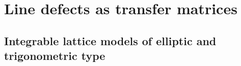 \newcommand{\Spinor}{S}
\newcommand{\PB}{P}
\newcommand{\KB}{\overline{K}}
\newcommand{\SG}{\mathscr{G}}
\newcommand{\SR}{\mathscr{R}}
\renewcommand{\SV}{\mathscr{V}}
\newcommand{\SP}{\mathscr{P}}
\newcommand{\ST}{\mathscr{T}}
\newcommand{\STb}{\overline{\mathscr{T}}}
\newcommand{\Mod}{\mathscr{M}}
\newcommand{\Lag}{\mathscr{L}}


\newcommand{\Qone}{\mathbf{Q}}
\newcommand{\QQ}{\slashed{Q}}
\newcommand{\QQt}{\widetilde{\QQ}}
\newcommand{\QK}{Q_K}
\newcommand{\QQK}{\QQ_{\mathrm{K}}}
\newcommand{\QQtK}{\QQt_{\mathrm{K}}}

\newcommand{\RW}{{\mathrm{RW}}}
\newcommand{\mRW}{{\mathrm{mRW}}}
\newcommand{\adj}{\mathrm{adj}}
\newcommand{\conf}{\mathrm{Conf}}

\newcommand{\betaSD}{\upbeta}
\newcommand{\gammaSD}{\upgamma}
\newcommand{\bSD}{\mathtt{b}}
\newcommand{\cSD}{\mathtt{c}}

\newcommand{\lbracket}[3]{\{#2 {}_{\,#1\,} #3\}}
\newcommand{\lBracket}[3]{[#2 {}_{\,#1\,} #3]}

\newcommand{\zmode}{{\textstyle\int}}

\newcommand{\NO}[1]{{\mathopen:\,#1\,\mathclose:}}
\newcommand{\ec}[1]{[\![#1]\!]}
\newcommand{\bigec}[1]{\bigl[\!\bigl[#1\bigr]\!\bigr]}
\newcommand{\biggec}[1]{\biggl[\!\!\biggl[#1\biggr]\!\!\biggr]}


\newcommand{\as}{\mathsf{a}}
\newcommand{\bs}{\mathsf{b}}
\newcommand{\ms}{\mathsf{m}}

\newcommand{\rootl}{\Lambda_{\mathrm{r}}}
\newcommand{\corootl}{\Lambda_{\mathrm{cr}}}
\newcommand{\weightl}{\Lambda_{\mathrm{w}}}
\newcommand{\coweightl}{\Lambda_{\mathrm{cw}}}

\newcommand{\mcharge}{\mathbf{m}}
\newcommand{\echarge}{\mathbf{e}}





\section{Line defects as transfer matrices}









\subsection{Integrable lattice models of elliptic and trigonometric type}
\label{sec:QIS}

